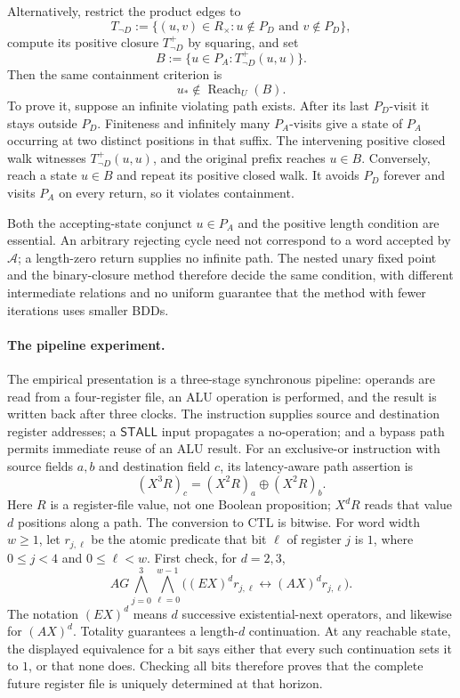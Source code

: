 Alternatively, restrict the product edges to
\[
 T_{\neg D}
   :=\{(u,v)\in R_\times:
                   u\notin P_D\text{ and }v\notin P_D\},
\]
compute its positive closure \(T_{\neg D}^{+}\) by squaring, and set
\[
 B:=\{u\in P_A:T_{\neg D}^{+}(u,u)\}.
\]
Then the same containment criterion is
\[
 u_*\notin\operatorname{Reach}_U(B).
\]
To prove it, suppose an infinite violating path exists. After its
last \(P_D\)-visit it stays outside \(P_D\). Finiteness and
infinitely many \(P_A\)-visits give a state of \(P_A\) occurring
at two distinct positions in that suffix. The intervening
positive closed walk witnesses \(T_{\neg D}^{+}(u,u)\), and
the original prefix reaches \(u\in B\).
Conversely, reach a state \(u\in B\) and repeat its positive
closed walk. It avoids \(P_D\) forever and visits \(P_A\)
on every return, so it violates containment.

Both the accepting-state conjunct \(u\in P_A\) and the positive
length condition are essential. An arbitrary rejecting cycle
need not correspond to a word accepted by \(\mathcal A\); a
length-zero return supplies no infinite path.
The nested unary fixed point and the binary-closure method
therefore decide the same condition, with different intermediate
relations and no uniform guarantee that the method with fewer
iterations uses smaller BDDs.

\paragraph{The pipeline experiment.}
The empirical presentation is a three-stage synchronous pipeline: operands are
read from a four-register file, an ALU operation is performed, and the result
is written back after three clocks.  The instruction supplies source and
destination register addresses; a \(\mathsf{STALL}\) input propagates a
no-operation; and a bypass path permits immediate reuse of an ALU result.  For
an exclusive-or instruction with source fields \(a,b\) and destination field
\(c\), its latency-aware path assertion is
\[
 (X^3R)_c=(X^2R)_a\mathbin{\oplus}(X^2R)_b.
\]
Here \(R\) is a register-file value, not one Boolean proposition;
\(X^dR\) reads that value \(d\) positions along a path. The conversion
to CTL is bitwise. For word width \(w\geq1\), let \(r_{j,\ell}\)
be the atomic predicate that bit \(\ell\) of register \(j\) is \(1\),
where \(0\leq j<4\) and \(0\leq\ell<w\).
First check, for \(d=2,3\),
\[
 AG\bigwedge_{j=0}^{3}\bigwedge_{\ell=0}^{w-1}
     \bigl((EX)^d r_{j,\ell}
              \leftrightarrow(AX)^d r_{j,\ell}\bigr).
\]
The notation \((EX)^d\) means \(d\) successive existential-next
operators, and likewise for \((AX)^d\). Totality guarantees a
length-\(d\) continuation. At any reachable state, the displayed
equivalence for a bit says either that every such continuation
sets it to \(1\), or that none does. Checking all bits therefore
proves that the complete future register file is uniquely
determined at that horizon.

